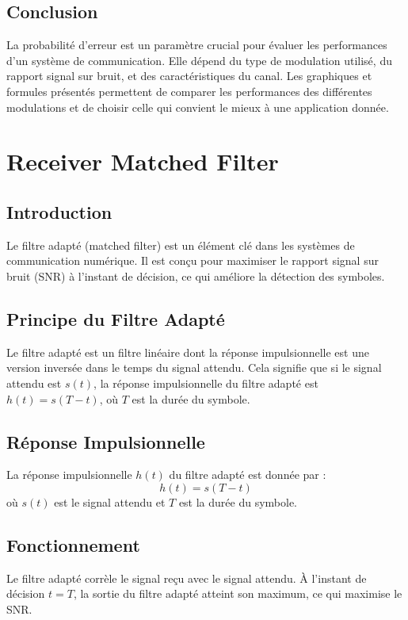 \documentclass[10pt,a4paper]{article}
\begin{document}
\subsection*{Conclusion}
La probabilité d'erreur est un paramètre crucial pour évaluer les performances d'un système de communication. Elle dépend du type de modulation utilisé, du rapport signal sur bruit, et des caractéristiques du canal. Les graphiques et formules présentés permettent de comparer les performances des différentes modulations et de choisir celle qui convient le mieux à une application donnée.

\section*{Receiver Matched Filter}

\subsection*{Introduction}
Le filtre adapté (matched filter) est un élément clé dans les systèmes de communication numérique. Il est conçu pour maximiser le rapport signal sur bruit (SNR) à l'instant de décision, ce qui améliore la détection des symboles.

\subsection*{Principe du Filtre Adapté}
Le filtre adapté est un filtre linéaire dont la réponse impulsionnelle est une version inversée dans le temps du signal attendu. Cela signifie que si le signal attendu est \( s(t) \), la réponse impulsionnelle du filtre adapté est \( h(t) = s(T - t) \), où \( T \) est la durée du symbole.

\subsection*{Réponse Impulsionnelle}
La réponse impulsionnelle \( h(t) \) du filtre adapté est donnée par :
\[ h(t) = s(T - t) \]
où \( s(t) \) est le signal attendu et \( T \) est la durée du symbole.

\subsection*{Fonctionnement}
Le filtre adapté corrèle le signal reçu avec le signal attendu. À l'instant de décision \( t = T \), la sortie du filtre adapté atteint son maximum, ce qui maximise le SNR.
\end{document}
